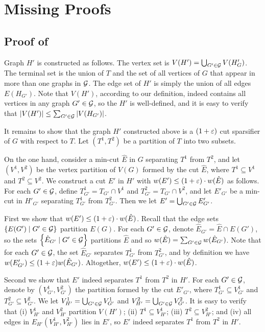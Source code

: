 \section{Missing Proofs}

\subsection{Proof of }
\label{apd: Proof of lem: divide}

Graph $H'$ is constructed as follows. The vertex set is $V(H')=\bigcup_{G'\in {\mathcal{G}}}V(H_G')$. The terminal set is the union of $T$ and the set of all vertices of $G$ that appear in more than one graphs in ${\mathcal{G}}$. The edge set of $H'$ is simply the union of all edges $E(H_{G'})$. Note that $V(H')$, according to our definition, indeed contains all vertices in any graph $G'\in {\mathcal{G}}$, so the $H'$ is well-defined, and it is easy to verify that $|V(H')|\le \sum_{G'\in {\mathcal{G}}}|V(H_{G'})|$.

It remains to show that the graph $H'$ constructed above is a $(1+{\varepsilon})$ cut sparsifier of $G$ with respect to $T$. Let $(T^1,T^2)$ be a partition of $T$ into two subsets.

On the one hand, consider a min-cut $\hat E$ in $G$ separating $T^1$ from $T^2$, and let $(V^1,V^2)$ be the vertex partition of $V(G)$ formed by the cut $\hat E$, where $T^1\subseteq V^1$ and $T^2\subseteq V^2$. We construct a cut $E'$ in $H'$ with $w(E')\le (1+{\varepsilon})\cdot w(\hat E)$ as follows. 
For each $G'\in {\mathcal{G}}$, define $T^1_{G'}=T_{G'}\cap V^1$ and $T^2_{G'}=T_{G'}\cap V^2$, and let $E'_{G'}$ be a min-cut in $H'_{G'}$ separating $T^1_{G'}$ from $T^2_{G'}$. 
Then we let $E'=\bigcup_{G'\in {\mathcal{G}}}E'_{G'}$.

First we show that $w(E')\le (1+{\varepsilon})\cdot w(\hat E)$.
Recall that the edge sets $\left\{ E(G')\mid G'\in {\mathcal{G}} \right\}$ partition $E(G)$. For each $G'\in {\mathcal{G}}$, denote $\hat E_{G'}=\hat E\cap E(G')$, so the sets $\left\{ \hat E_{G'} \mid G'\in {\mathcal{G}} \right\}$ partitions $\hat E$ and so $w(\hat E)=\sum_{G'\in {\mathcal{G}}}w(\hat E_{G'})$.
Note that for each $G'\in {\mathcal{G}}$, the set $\hat E_{G'}$ separates $T^1_{G'}$ from $T^2_{G'}$, and by definition we have $w(E'_{G'})\le (1+{\varepsilon}) w(\hat E_{G'})$. Altogether, $w(E')\le (1+{\varepsilon})\cdot w(\hat E)$.

Second we show that $E'$ indeed separates $T^1$ from $T^2$ in $H'$. For each $G'\in {\mathcal{G}}$, denote by $(V^1_{G'},V^2_{G'})$ the partition formed by the cut $E'_{G'}$, where $T^1_{G'}\subseteq V^1_{G'}$ and $T^2_{G'}\subseteq V^2_{G'}$. We let $V^1_{H'}=\bigcup_{G'\in {\mathcal{G}}}V^1_{G'}$ and $V^2_{H'}=\bigcup_{G'\in {\mathcal{G}}}V^2_{G'}$.
It is easy to verify that (i) $V^1_{H'}$ and $V^2_{H'}$ partition $V(H')$; (ii) $T^1\subseteq V^1_{H'}$; (iii) $T^2\subseteq V^2_{H'}$; and (iv) all edges in $E_{H'}(V^1_{H'},V^2_{H'})$ lies in $E'$, so $E'$ indeed separates $T^1$ from $T^2$ in $H'$.

